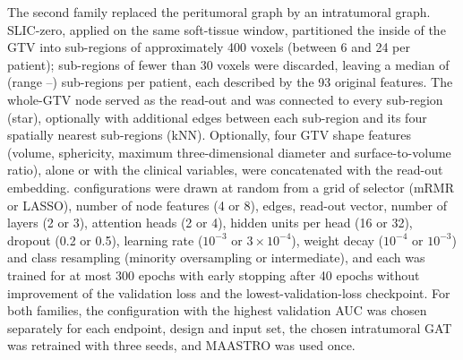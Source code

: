 \documentclass[11pt,a4paper]{article}
\begin{document}
The second family replaced the peritumoral graph by an intratumoral graph. SLIC-zero, applied on the same soft-tissue window, partitioned the inside of the GTV into sub-regions of approximately 400 voxels (between 6 and 24 per patient); sub-regions of fewer than 30 voxels were discarded, leaving a median of \gtvSubMed{} (range \gtvSubMin--\gtvSubMax) sub-regions per patient, each described by the 93 original features. The whole-GTV node served as the read-out and was connected to every sub-region (star), optionally with additional edges between each sub-region and its four spatially nearest sub-regions (kNN). Optionally, four GTV shape features (volume, sphericity, maximum three-dimensional diameter and surface-to-volume ratio), alone or with the clinical variables, were concatenated with the read-out embedding. \gtvNgat{} configurations were drawn at random from a grid of selector (mRMR or LASSO), number of node features (4 or 8), edges, read-out vector, number of layers (2 or 3), attention heads (2 or 4), hidden units per head (16 or 32), dropout (0.2 or 0.5), learning rate ($10^{-3}$ or $3\times10^{-4}$), weight decay ($10^{-4}$ or $10^{-3}$) and class resampling (minority oversampling or intermediate), and each was trained for at most 300 epochs with early stopping after 40 epochs without improvement of the validation loss and the lowest-validation-loss checkpoint. For both families, the configuration with the highest validation AUC was chosen separately for each endpoint, design and input set, the chosen intratumoral GAT was retrained with three seeds, and MAASTRO was used once.
\end{document}
